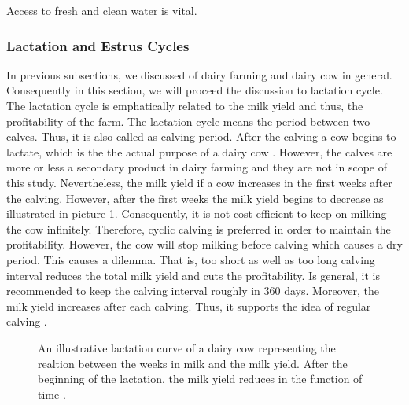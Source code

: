 \documentclass[english,12pt,a4paper,pdftex,elec,utf8]{aaltothesis}
\begin{document}
 Access to fresh and clean water is vital. \cite{luomuopas} 



\subsubsection{Lactation and Estrus Cycles} \label{lactationandestruscyclessection}

In previous subsections, we discussed of dairy farming and dairy cow in general. Consequently in this section, we will proceed the discussion to lactation cycle. The lactation cycle is emphatically related to the milk yield and thus, the profitability of the farm. The lactation cycle means the period between two calves. Thus, it is also called as calving period. After the calving a cow begins to lactate, which is the the actual purpose of a dairy cow \cite{lehmahavaintoja}. However, the calves are more or less a secondary product in dairy farming and they are not in scope of this study. Nevertheless, the milk yield if a cow increases in the first weeks after the calving. However, after the first weeks the milk yield begins to decrease as illustrated in picture \ref{lactationapproximation}. Consequently, it is not cost-efficient to keep on milking the cow infinitely. Therefore, cyclic calving is preferred in order to maintain the profitability. However, the cow will stop milking before calving which causes a dry period. This causes a dilemma. That is, too short as well as too long calving interval reduces the total milk yield and cuts the profitability. Is general, it is recommended to keep the calving interval roughly in 360 days. Moreover, the milk yield increases after each calving. Thus, it supports the idea of regular calving \cite{lehmientuotoskasvaa}.

 \begin{figure}
 \centering
    \caption{An illustrative lactation curve of a dairy cow representing the realtion between the weeks in milk and the milk yield. After the beginning of the lactation, the milk yield reduces in the function of time \cite{lactationcurve}.} \label{lactationapproximation}
 \end{figure}
\end{document}
